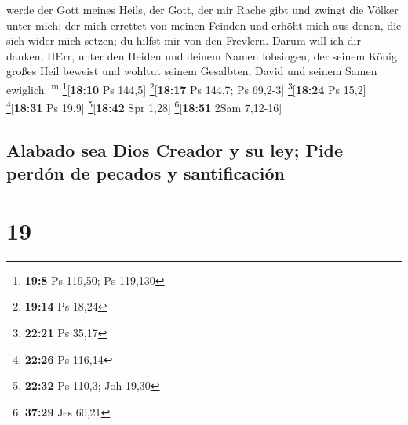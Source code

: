 werde der Gott meines Heils,  der Gott, der mir Rache
gibt und zwingt die Völker unter mich;  der mich errettet
von meinen Feinden und erhöht mich aus denen, die sich wider mich
setzen; du hilfst mir von den Frevlern.  Darum will ich
dir danken, HErr, unter den Heiden und deinem Namen lobsingen,
 der seinem König großes Heil beweist und wohltut seinem
Gesalbten, David und seinem Samen ewiglich. \textsuperscript{m}
\footnote{\textbf{19:8} Ps 119,50; Ps 119,130}{[}\textbf{18:10} Ps
144,5{]} \footnote{\textbf{19:14} Ps 18,24}{[}\textbf{18:17} Ps 144,7;
Ps 69,2-3{]} \footnote{\textbf{22:21} Ps 35,17}{[}\textbf{18:24} Ps
15,2{]} \footnote{\textbf{22:26} Ps 116,14}{[}\textbf{18:31} Ps 19,9{]}
\footnote{\textbf{22:32} Ps 110,3; Joh 19,30}{[}\textbf{18:42} Spr
1,28{]} \footnote{\textbf{37:29} Jes 60,21}{[}\textbf{18:51} 2Sam
7,12-16{]}

\hypertarget{alabado-sea-dios-creador-y-su-ley-pide-perduxf3n-de-pecados-y-santificaciuxf3n}{%
\subsection{Alabado sea Dios Creador y su ley; Pide perdón de pecados y
santificación}\label{alabado-sea-dios-creador-y-su-ley-pide-perduxf3n-de-pecados-y-santificaciuxf3n}}

\hypertarget{section-18}{%
\section{19}\label{section-18}}

